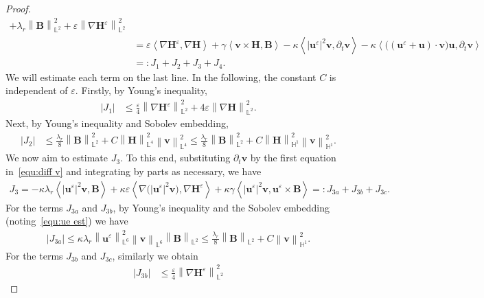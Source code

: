 \documentclass[10pt,a4paper]{amsart}
\newcommand{\abs}[1]{\left|{#1}\right|}
\newcommand{\bb}{\mathbb}
\newcommand{\bff}{\boldsymbol}
\newcommand{\inpro}[2]{\left\langle#1,#2\right\rangle}
\newcommand{\norm}[2]{\left\|{#1}\right\|_{#2}}
\begin{document}
\begin{proof}
\begin{align}
	+
	\lambda_r \norm{\bff{B}}{\bb{L}^2}^2
	+
	\varepsilon \norm{\nabla \bff{H}^\varepsilon}{\bb{L}^2}^2
	\nonumber \\
	&=
	\varepsilon \inpro{\nabla \bff{H}^\varepsilon}{\nabla \bff{H}}
	+
	\gamma \inpro{\bff{v}\times \bff{H}}{\bff{B}}
	-
	\kappa \inpro{|\bff{u}^\varepsilon|^2 \bff{v}}{\partial_t \bff{v}}
	-
	\kappa \inpro{\big( (\bff{u}^\varepsilon+\bff{u})\cdot \bff{v} \big) \bff{u}}{\partial_t \bff{v}}
	\nonumber \\
	&=: J_1+J_2+J_3+J_4.
\end{align}
We will estimate each term on the last line. In the following, the constant $C$ is independent of $\varepsilon$. Firstly, by Young's inequality,
\begin{align}\label{equ:J1}
	\abs{J_1}
	&\leq
	\frac{\varepsilon}{4} \norm{\nabla \bff{H}^\varepsilon}{\bb{L}^2}^2
	+
	4\varepsilon \norm{\nabla \bff{H}}{\bb{L}^2}^2.
\end{align}
Next, by Young's inequality and Sobolev embedding,
\begin{align}\label{equ:J2}
	\abs{J_2}
	&\leq
	\frac{\lambda_r}{8} \norm{\bff{B}}{\bb{L}^2}^2
	+
	C \norm{\bff{H}}{\bb{L}^4}^2 \norm{\bff{v}}{\bb{L}^4}^2
	\leq
	\frac{\lambda_r}{8} \norm{\bff{B}}{\bb{L}^2}^2
	+
	C \norm{\bff{H}}{\bb{H}^1}^2 \norm{\bff{v}}{\bb{H}^1}^2.
\end{align}
We now aim to estimate $J_3$. To this end, substituting $\partial_t \bff{v}$ by the first equation in~\eqref{equ:diff v} and integrating by parts as necessary, we have
\begin{align}\label{equ:L123}
	 J_3
	 =
	 -\kappa\lambda_r \inpro{|\bff{u}^\varepsilon|^2 \bff{v}}{\bff{B}}
	 +
	 \kappa \varepsilon \inpro{\nabla\big(|\bff{u}^\varepsilon|^2 \bff{v}\big)}{\nabla \bff{H}^\varepsilon}
	 +
	 \kappa \gamma \inpro{|\bff{u}^\varepsilon|^2 \bff{v}}{\bff{u}^\varepsilon\times \bff{B}}
	 =: J_{3a}+J_{3b}+J_{3c}.
\end{align}
For the terms $J_{3a}$ and $J_{3b}$, by Young's inequality and the Sobolev embedding (noting~\eqref{equ:ue est}) we have
\begin{align*}
	\abs{J_{3a}} 
	\leq
	\kappa \lambda_r \norm{\bff{u}^\varepsilon}{\bb{L}^6}^2 \norm{\bff{v}}{\bb{L}^6} \norm{\bff{B}}{\bb{L}^2}
	\leq
	\frac{\lambda_r}{8} \norm{\bff{B}}{\bb{L}^2}
	+
	C \norm{\bff{v}}{\bb{H}^1}^2.
\end{align*}
For the terms $J_{3b}$ and $J_{3c}$, similarly we obtain
\begin{align*}
	\abs{J_{3b}}
	&\leq
	\frac{\varepsilon}{4} \norm{\nabla \bff{H}^\varepsilon}{\bb{L}^2}^2

\end{align*}
\end{proof}
\end{document}
